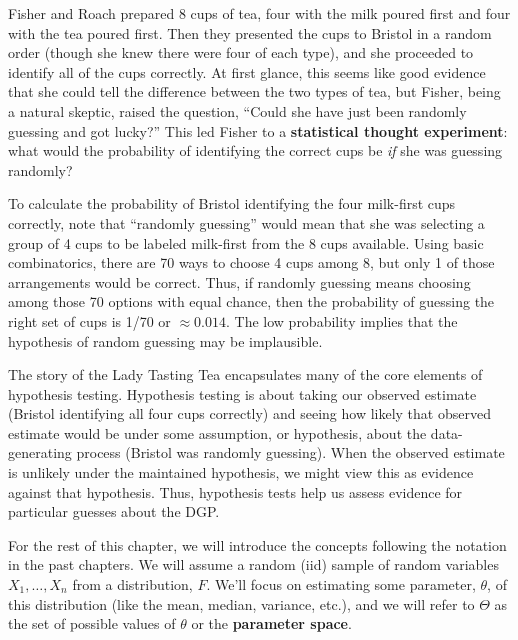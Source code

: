 \documentclass[
  letterpaper,
  DIV=11,
  numbers=noendperiod]{scrreprt}
\theoremstyle{definition}
\theoremstyle{definition}
\theoremstyle{plain}
\theoremstyle{remark}
\begin{document}
Fisher and Roach prepared 8 cups of tea, four with the milk poured first
and four with the tea poured first. Then they presented the cups to
Bristol in a random order (though she knew there were four of each
type), and she proceeded to identify all of the cups correctly. At first
glance, this seems like good evidence that she could tell the difference
between the two types of tea, but Fisher, being a natural skeptic,
raised the question, ``Could she have just been randomly guessing and
got lucky?'' This led Fisher to a \textbf{statistical thought
experiment}: what would the probability of identifying the correct cups
be \emph{if} she was guessing randomly?

To calculate the probability of Bristol identifying the four milk-first
cups correctly, note that ``randomly guessing'' would mean that she was
selecting a group of 4 cups to be labeled milk-first from the 8 cups
available. Using basic combinatorics, there are 70 ways to choose 4 cups
among 8, but only 1 of those arrangements would be correct. Thus, if
randomly guessing means choosing among those 70 options with equal
chance, then the probability of guessing the right set of cups is 1/70
or \(\approx 0.014\). The low probability implies that the hypothesis of
random guessing may be implausible.

The story of the Lady Tasting Tea encapsulates many of the core elements
of hypothesis testing. Hypothesis testing is about taking our observed
estimate (Bristol identifying all four cups correctly) and seeing how
likely that observed estimate would be under some assumption, or
hypothesis, about the data-generating process (Bristol was randomly
guessing). When the observed estimate is unlikely under the maintained
hypothesis, we might view this as evidence against that hypothesis.
Thus, hypothesis tests help us assess evidence for particular guesses
about the DGP.

\begin{tcolorbox}[enhanced jigsaw, breakable, colback=white, left=2mm, colbacktitle=quarto-callout-note-color!10!white, rightrule=.15mm, toprule=.15mm, bottomtitle=1mm, toptitle=1mm, leftrule=.75mm, coltitle=black, arc=.35mm, title=\textcolor{quarto-callout-note-color}{\faInfo}\hspace{0.5em}{Notation alert}, titlerule=0mm, colframe=quarto-callout-note-color-frame, bottomrule=.15mm, opacitybacktitle=0.6, opacityback=0]

For the rest of this chapter, we will introduce the concepts following
the notation in the past chapters. We will assume a random (iid) sample
of random variables \(X_1, \ldots, X_n\) from a distribution, \(F\).
We'll focus on estimating some parameter, \(\theta\), of this
distribution (like the mean, median, variance, etc.), and we will refer
to \(\Theta\) as the set of possible values of \(\theta\) or the
\textbf{parameter space}.

\end{tcolorbox}
\end{document}
